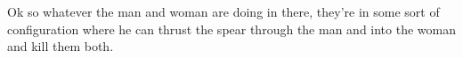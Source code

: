{
	Ok so whatever the man and woman are doing in there, they're in
	some sort of configuration where he can thrust the spear through
	the man and into the woman and kill them both.%
}

